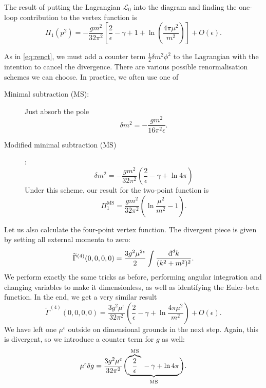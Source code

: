 The result of putting the Lagrangian $\mathscr{L}_0$ into the diagram and finding the one-loop contribution to the vertex function is
\begin{equation}
  \Pi_1(p^2) = -\frac{g m^2}{32 \pi^2} \left[ \frac{2}{\epsilon} - \gamma + 1 + \ln(\frac{4\pi\mu^2}{m^2}) \right] + O(\epsilon).
\end{equation}

As in \eqref{eq:renct}, we must add a counter term $\frac{1}{2} \delta m^2 \phi^2$ to the Lagrangian with the intention to cancel the divergence.
There are various possible renormalisation schemes we can choose. In practice, we often use one of
\begin{description}
  \item[Minimal subtraction (MS):]  Just absorb the pole
    \begin{equation}
      \delta m^2 = - \frac{g m^2}{16 \pi^2 \epsilon}.
    \end{equation}
  \item[Modified minimal subtraction ($\overline{\text{MS}}{}$)]:
    \begin{equation}
      \delta m^2 = - \frac{g m^2}{32 \pi^2} \left( \frac{2}{\epsilon} - \gamma + \ln 4 \pi \right)
    \end{equation}
    Under this scheme, our result for the two-point function is
    \begin{equation}
      \Pi_1^{\overline{\text{MS}}{}} = \frac{g m^2}{32 \pi^2} \left( \ln \frac{\mu^2}{m^2} - 1 \right).
    \end{equation}
\end{description}

Let us also calculate the four-point vertex function.
The divergent piece is given by setting all external momenta to zero:
\begin{equation}
  \widetilde{\Gamma}^{(4)} (0,0,0,0) = \frac{3 g^2 \mu^{2 \epsilon}}{2} \int \frac{\bdd[d]{k}}{(k^2 + m^2)^2}.
\end{equation}
We perform exactly the same tricks as before, performing angular integration and changing variables to make it dimensionless, as well as identifying the Euler-beta function.
In the end, we get a very similar result
\begin{equation}
  \widetilde{\Gamma}^{(4)} (0,0,0,0) = \frac{3 g^2 \mu^\epsilon}{32 \pi^2} \left( \frac{2}{\epsilon} - \gamma + \ln \frac{4 \pi \mu^2}{m^2} \right) + O(\epsilon).
\end{equation}
We have left one $\mu^\epsilon$ outside on dimensional grounds in the next step.
Again, this is divergent, so we introduce a counter term for $g$ as well:
\begin{equation}
  \label{eq:11-dg}
  \mu^\epsilon \delta g = \frac{3 g^2 \mu^{\epsilon}}{32 \pi^2} \biggl( \underbrace{ \overbrace{\frac{2}{\epsilon}}^{\mathclap{\text{MS}}} {} - \gamma + \ln 4 \pi }_{\mathclap{\overline{\text{MS}}{}}} \biggr).
\end{equation}

